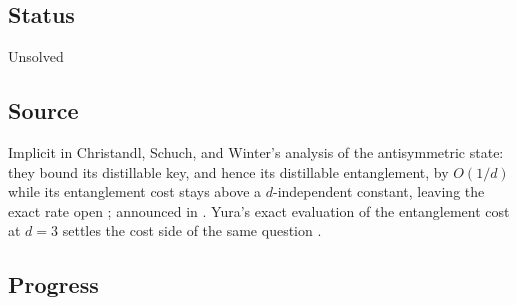 \subsection*{Status}

Unsolved

\subsection*{Source}

Implicit in Christandl, Schuch, and Winter's analysis of the antisymmetric
state: they bound its distillable key, and hence its distillable entanglement,
by $O(1/d)$ while its entanglement cost stays above a $d$-independent
constant, leaving the exact rate open
; announced in
.  Yura's exact evaluation of the
entanglement cost at $d=3$ settles the cost side of the same question
.

\subsection*{Progress}

